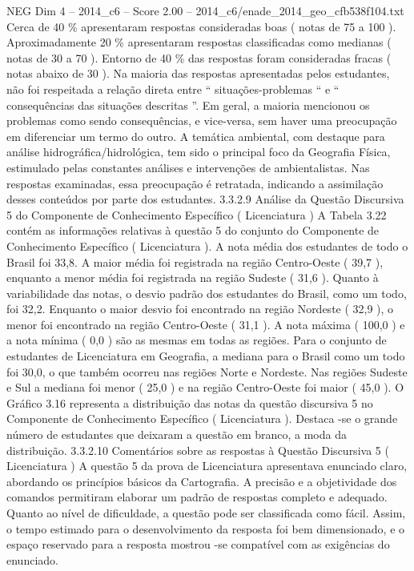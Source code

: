 \begin{textsample}{NEG Dim 4 – 2014\_c6 – Score 2.00 – 2014\_c6/enade\_2014\_geo\_cfb538f104.txt}
Cerca de 40 \% apresentaram respostas consideradas boas ( notas de 75 a 100 ).
Aproximadamente 20 \% apresentaram respostas classificadas como medianas ( notas de 30 a 70 ).
Entorno de 40 \% das respostas foram consideradas fracas ( notas abaixo de 30 ).
Na maioria das respostas apresentadas pelos estudantes, não foi respeitada a relação direta entre “ situações-problemas “ e “ consequências das situações descritas ”.
Em geral, a maioria mencionou os problemas como sendo consequências, e vice-versa, sem haver uma preocupação em diferenciar um termo do outro.
A temática ambiental, com destaque para análise hidrográfica/hidrológica, tem sido o principal foco da Geografia Física, estimulado pelas constantes análises e intervenções de ambientalistas.
Nas respostas examinadas, essa preocupação é retratada, indicando a assimilação desses conteúdos por parte dos estudantes. 3.3.2.9 Análise da Questão Discursiva 5 do Componente de Conhecimento Específico ( Licenciatura ) A Tabela 3.22 contém as informações relativas à questão 5 do conjunto do Componente de Conhecimento Específico ( Licenciatura ).
A nota média dos estudantes de todo o Brasil foi 33,8.
A maior média foi registrada na região Centro-Oeste ( 39,7 ), enquanto a menor média foi registrada na região Sudeste ( 31,6 ).
Quanto à variabilidade das notas, o desvio padrão dos estudantes do Brasil, como um todo, foi 32,2.
Enquanto o maior desvio foi encontrado na região Nordeste ( 32,9 ), o menor foi encontrado na região Centro-Oeste ( 31,1 ).
A nota máxima ( 100,0 ) e a nota mínima ( 0,0 ) são as mesmas em todas as regiões.
Para o conjunto de estudantes de Licenciatura em Geografia, a mediana para o Brasil como um todo foi 30,0, o que também ocorreu nas regiões Norte e Nordeste.
Nas regiões Sudeste e Sul a mediana foi menor ( 25,0 ) e na região Centro-Oeste foi maior ( 45,0 ).
O Gráfico 3.16 representa a distribuição das notas da questão discursiva 5 no Componente de Conhecimento Específico ( Licenciatura ).
Destaca -se o grande número de estudantes que deixaram a questão em branco, a moda da distribuição. 3.3.2.10 Comentários sobre as respostas à Questão Discursiva 5 ( Licenciatura ) A questão 5 da prova de Licenciatura apresentava enunciado claro, abordando os princípios básicos da Cartografia.
A precisão e a objetividade dos comandos permitiram elaborar um padrão de respostas completo e adequado.
Quanto ao nível de dificuldade, a questão pode ser classificada como fácil.
Assim, o tempo estimado para o desenvolvimento da resposta foi bem dimensionado, e o espaço reservado para a resposta mostrou -se compatível com as exigências do enunciado.

\end{textsample}
